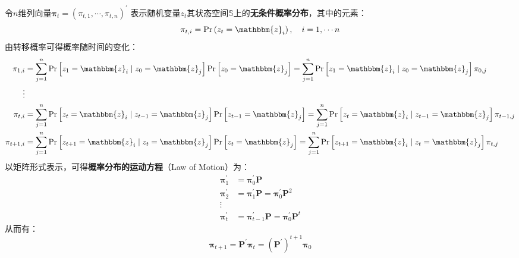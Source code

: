 令$n$维列向量$\boldsymbol{\pi}_t=\left(\pi_{t,1},\cdots,\pi_{t,n}\right)^{\prime}$
表示随机变量$z_t$其状态空间$\mathbb{S}$上的\textbf{无条件概率分布}，其中的元素：
\begin{equation*}
    \pi_{t,i} = \operatorname{Pr}\left(z_t = \mathbbm{z}_i\right), \quad i=1,\cdots n
\end{equation*}
由转移概率可得概率随时间的变化：
\begin{equation*}
    \begin{aligned}
        \pi_{1, i} &= \sum_{j=1}^n \operatorname{Pr}\left[z_1=\mathbbm{z}_i \mid z_0=\mathbbm{z}_j\right] 
                        \operatorname{Pr}\left[z_0=\mathbbm{z}_j\right] 
                    =  \sum_{j=1}^n \operatorname{Pr}\left[z_1=\mathbbm{z}_i \mid z_0=\mathbbm{z}_j\right]\pi_{0,j}  \\
        \vdots & \\
        \pi_{t, i} &= \sum_{j=1}^n \operatorname{Pr}\left[z_t=\mathbbm{z}_i \mid z_{t-1}=\mathbbm{z}_j\right] 
                        \operatorname{Pr}\left[z_{t-1}=\mathbbm{z}_j\right] 
                    =  \sum_{j=1}^n \operatorname{Pr}\left[z_t=\mathbbm{z}_i \mid z_{t-1}=\mathbbm{z}_j\right]\pi_{t-1,j}  \\
        \pi_{t+1, i} &= \sum_{j=1}^n \operatorname{Pr}\left[z_{t+1}=\mathbbm{z}_i \mid z_t=\mathbbm{z}_j\right] 
                        \operatorname{Pr}\left[z_t=\mathbbm{z}_j\right]
                    =  \sum_{j=1}^n \operatorname{Pr}\left[z_{t+1}=\mathbbm{z}_i \mid z_t=\mathbbm{z}_j\right]\pi_{t,j}
        \end{aligned}
\end{equation*}
以矩阵形式表示，可得\textbf{概率分布的运动方程}（Law of Motion）为：
\begin{equation*}
    \begin{aligned}
        \boldsymbol{\pi}_1^{\prime} &= \boldsymbol{\pi}_0^{\prime}\boldsymbol{P} \\
        \boldsymbol{\pi}_2^{\prime} &= \boldsymbol{\pi}_1^{\prime}\boldsymbol{P} 
            = \boldsymbol{\pi}_0^{\prime}\boldsymbol{P}^2 \\
        \vdots & \\
        \boldsymbol{\pi}_t^{\prime} &= \boldsymbol{\pi}_{t-1}^{\prime}\boldsymbol{P} 
            = \boldsymbol{\pi}_0^{\prime}\boldsymbol{P}^t
    \end{aligned}
\end{equation*}
从而有：
\begin{equation}    \label{eq-markov-pr-motion}
    \boldsymbol{\pi}_{t+1} = \boldsymbol{P}^{\prime}\boldsymbol{\pi}_t 
        = \left(\boldsymbol{P}^{\prime}\right)^{t+1}\boldsymbol{\pi}_0
\end{equation}


